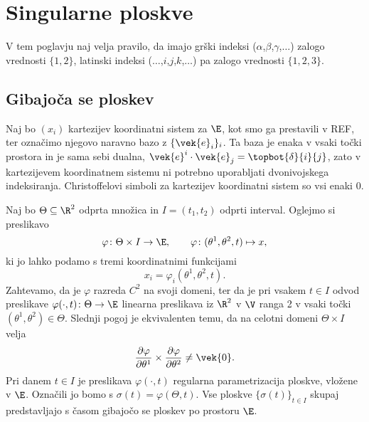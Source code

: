 \chapter{Singularne ploskve}



V tem poglavju naj velja pravilo, da imajo grški indeksi ($\alpha$,$\beta$,$\gamma$,$\dots$) zalogo
vrednosti $\{1,2\}$, latinski indeksi ($\dots$,$i$,$j$,$k$,$\dots$) pa zalogo vrednosti $\{1,2,3\}$.


\section{Gibajoča se ploskev}


Naj bo $(x_i)$ kartezijev koordinatni sistem za $\E$, kot smo ga prestavili v REF, ter označimo
njegovo naravno bazo z $\{\vek{e}_i\}_i$. Ta baza je enaka v vsaki točki prostora in je sama
sebi dualna, $\vek{e}^i\cdot\vek{e}_j=\topbot{\delta}{i}{j}$, zato v kartezijevem
koordinatnem sistemu ni potrebno uporabljati dvonivojskega indeksiranja.
Christoffelovi simboli za kartezijev koordinatni sistem so vsi enaki 0.

Naj bo $\Theta\subseteq\R^2$ odprta množica in $I=(t_1,t_2)$ odprti interval.
Oglejmo si preslikavo
\begin{equation} \label{e:pargip}
	\varphi\colon\Theta\times I\to\E,\qquad \varphi\colon(\theta^1,\theta^2,t)\mapsto x,
\end{equation}
ki jo lahko podamo s tremi koordinatnimi funkcijami
\[
	x_i=\varphi_i(\theta^1,\theta^2,t).
\]
Zahtevamo, da je $\varphi$ razreda $C^2$ na svoji domeni, ter da je pri vsakem $t\in I$ 
odvod preslikave $\varphi(\cdot,t)\colon \Theta\to\E$ linearna preslikava iz $\R^2$ v $\V$ ranga 2 v vsaki
točki $(\theta^1,\theta^2)\in\Theta$. Slednji pogoj je ekvivalenten temu, da na celotni domeni
$\Theta\times I$ velja
\[ \frac{\partial\varphi}{\partial\theta^1}\times\frac{\partial\varphi}{\partial\theta^2}\neq \vek{0}. \]
Pri danem $t\in I$ je preslikava $\varphi(\cdot,t)$ regularna parametrizacija ploskve,
vložene v $\E$. Označili jo bomo s $\sigma(t)=\varphi(\Theta,t)$. Vse ploskve $\{\sigma(t)\}_{t\in I}$
skupaj predstavljajo s časom gibajočo se ploskev po prostoru $\E$.

